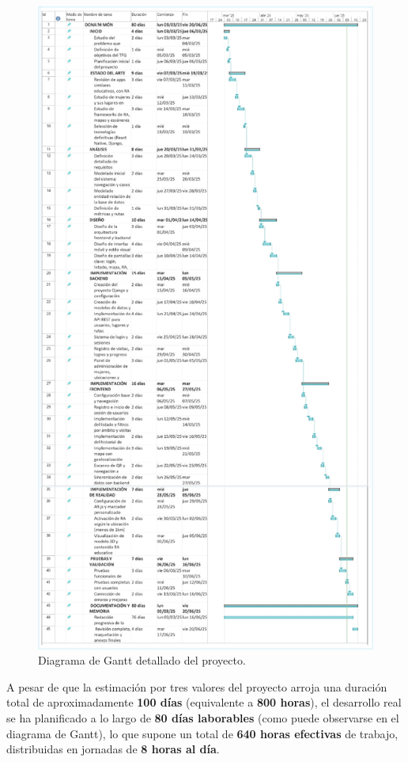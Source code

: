 \begin{figure}[H]
    \centering
    \includegraphics[width=\textwidth,height=0.95\textheight,keepaspectratio]{figs/gantt.jpg}
    \caption{Diagrama de Gantt detallado del proyecto.}
    \label{fig:gantt}
\end{figure} 

A pesar de que la estimación por tres valores del proyecto arroja una duración total de aproximadamente \textbf{100 días} (equivalente a \textbf{800 horas}), el desarrollo real se ha planificado a lo largo de \textbf{80 días laborables} (como puede observarse en el diagrama de Gantt), lo que supone un total de \textbf{640 horas efectivas} de trabajo, distribuidas en jornadas de \textbf{8 horas al día}.

